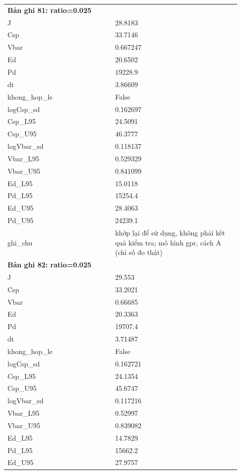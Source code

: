 \begin{longtable}{p{0.43\linewidth}p{0.50\linewidth}}
\midrule
\multicolumn{2}{p{0.95\linewidth}}{\textbf{Bản ghi 81: ratio=0.025}} \\
J & 28.8183 \\
Csp & 33.7146 \\
Vbar & 0.667247 \\
Ed & 20.6502 \\
Pd & 19228.9 \\
dt & 3.86609 \\
khong\_\allowbreak hop\_\allowbreak le & False \\
logCsp\_\allowbreak sd & 0.162697 \\
Csp\_\allowbreak L95 & 24.5091 \\
Csp\_\allowbreak U95 & 46.3777 \\
logVbar\_\allowbreak sd & 0.118137 \\
Vbar\_\allowbreak L95 & 0.529329 \\
Vbar\_\allowbreak U95 & 0.841099 \\
Ed\_\allowbreak L95 & 15.0118 \\
Pd\_\allowbreak L95 & 15254.4 \\
Ed\_\allowbreak U95 & 28.4063 \\
Pd\_\allowbreak U95 & 24239.1 \\
ghi\_\allowbreak chu & khớp lại để sử dụng, không phải kết quả kiểm tra; mô hình gpr, cách A (chỉ số đo thật) \\
\midrule
\multicolumn{2}{p{0.95\linewidth}}{\textbf{Bản ghi 82: ratio=0.025}} \\
J & 29.553 \\
Csp & 33.2021 \\
Vbar & 0.66685 \\
Ed & 20.3363 \\
Pd & 19707.4 \\
dt & 3.71487 \\
khong\_\allowbreak hop\_\allowbreak le & False \\
logCsp\_\allowbreak sd & 0.162721 \\
Csp\_\allowbreak L95 & 24.1354 \\
Csp\_\allowbreak U95 & 45.6747 \\
logVbar\_\allowbreak sd & 0.117216 \\
Vbar\_\allowbreak L95 & 0.52997 \\
Vbar\_\allowbreak U95 & 0.839082 \\
Ed\_\allowbreak L95 & 14.7829 \\
Pd\_\allowbreak L95 & 15662.2 \\
Ed\_\allowbreak U95 & 27.9757 \\

\end{longtable}
